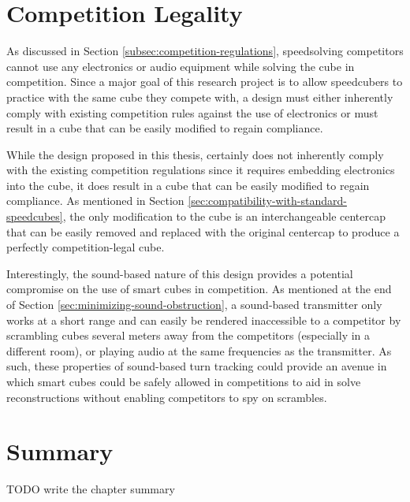 \section{Competition Legality}
\label{sec:competition-legality}

As discussed in Section \ref{subsec:competition-regulations},
speedsolving competitors cannot use any electronics or audio equipment
while solving the cube in competition. Since a major goal of this
research project is to allow speedcubers to practice with the same cube
they compete with, a design must either inherently comply with existing
competition rules against the use of electronics or must result in a
cube that can be easily modified to regain compliance.

While the design proposed in this thesis, certainly does not inherently
comply with the existing competition regulations since it requires
embedding electronics into the cube, it does result in a cube that can
be easily modified to regain compliance. As mentioned in Section
\ref{sec:compatibility-with-standard-speedcubes}, the only modification
to the cube is an interchangeable centercap that can be easily removed
and replaced with the original centercap to produce a perfectly
competition-legal cube.

Interestingly, the sound-based nature of this design provides a
potential compromise on the use of smart cubes in competition. As
mentioned at the end of Section \ref{sec:minimizing-sound-obstruction},
a sound-based transmitter only works at a short range and can easily be
rendered inaccessible to a competitor by scrambling cubes several
meters away from the competitors (especially in a different room), or
playing audio at the same frequencies as the transmitter. As such,
these properties of sound-based turn tracking could provide an avenue
in which smart cubes could be safely allowed in competitions to aid in
solve reconstructions without enabling competitors to spy on scrambles.

\section{Summary}
TODO write the chapter summary

